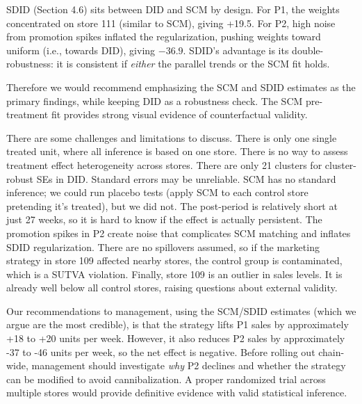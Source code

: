 \documentclass[10pt]{article}
\begin{document}
SDID (Section 4.6) sits between DID and SCM by design. For P1, the weights concentrated on store 111 (similar to SCM), giving +19.5. For P2, high noise from promotion spikes inflated the regularization, pushing weights toward uniform (i.e., towards DID), giving $-36.9$. SDID's advantage is its double-robustness: it is consistent if \textit{either} the parallel trends or the SCM fit holds. 

Therefore we would recommend emphasizing the SCM and SDID estimates as the primary findings, while keeping DID as a robustness check. The SCM pre-treatment fit provides strong visual evidence of counterfactual validity. 

There are some challenges and limitations to discuss. There is only one single treated unit, where all inference is based on one store. There is no way to assess treatment effect heterogeneity across stores. There are only 21 clusters for cluster-robust SEs in DID. Standard errors may be unreliable. SCM has no standard inference; we could run placebo tests (apply SCM to each control store pretending it's treated), but we did not. The post-period is relatively short at just 27 weeks, so it is hard to know if the effect is actually persistent. The promotion spikes in P2 create noise that complicates SCM matching and inflates SDID regularization. There are no spillovers assumed, so if the marketing strategy in store 109 affected nearby stores, the control group is contaminated, which is a SUTVA violation. Finally, store 109 is an outlier in sales levels. It is already well below all control stores, raising questions about external validity. 

Our recommendations to management, using the SCM/SDID estimates (which we argue are the most credible), is that the strategy lifts P1 sales by approximately +18 to +20 units per week. However, it also reduces P2 sales by approximately -37 to -46 units per week, so the net effect is negative. Before rolling out chain-wide, management should investigate \textit{why} P2 declines and whether the strategy can be modified to avoid cannibalization. A proper randomized trial across multiple stores would provide definitive evidence with valid statistical inference. 


\newpage
\printbibliography[title={References}]

\end{document}

